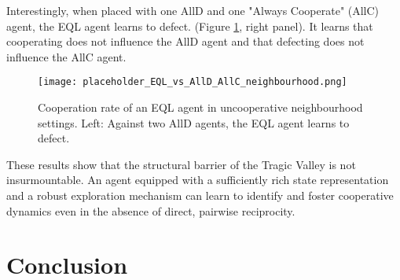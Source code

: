 \documentclass[]{llncs} %
\begin{document}
Interestingly, when placed with one AllD and one "Always Cooperate" (AllC) agent, the EQL agent learns to defect. (Figure \ref{fig:EQL_vs_AllD_AllC_neighbourhood}, right panel). It learns that cooperating does not influence the AllD agent and that defecting does not influence the AllC agent.

\begin{figure}[ht]
    \centering
    \texttt{[image: placeholder\_EQL\_vs\_AllD\_AllC\_neighbourhood.png]}
    \caption{Cooperation rate of an EQL agent in uncooperative neighbourhood settings. Left: Against two AllD agents, the EQL agent learns to defect.}
    \label{fig:EQL_vs_AllD_AllC_neighbourhood}
\end{figure}

These results show that the structural barrier of the Tragic Valley is not insurmountable. An agent equipped with a sufficiently rich state representation and a robust exploration mechanism can learn to identify and foster cooperative dynamics even in the absence of direct, pairwise reciprocity.


\section{Conclusion}
\label{sec:conclusion}




\begin{subappendices} %
\label{app:original_results}


\end{subappendices}
\end{document}
